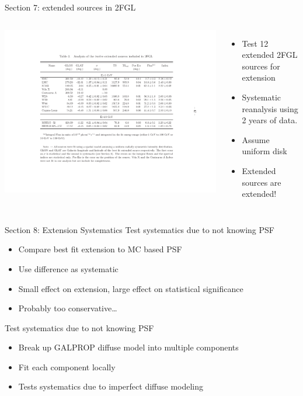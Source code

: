 \documentclass[12pt]{beamer}
\begin{document}
\begin{frame}{Section 7: extended sources in 2FGL}
  \begin{columns}
    \includegraphics[scale=0.4]{plots/table_reanalysis.pdf}
    \begin{itemize}
      \item Test 12 extended 2FGL sources for extension
      \item Systematic reanalysis using 2 years of data.
      \item Assume uniform disk
      \item Extended sources are extended!
    \end{itemize}
  \end{columns}
\end{frame}

\begin{frame}{Section 8: Extension Systematics}
  Test systematics due to not knowing PSF
  \begin{itemize}
    \item Compare best fit extension to 
      MC based PSF
    \item Use difference as systematic
    \item Small effect on extension, large effect on statistical 
      significance
    \item Probably too conservative\dots
  \end{itemize}
  Test systematics due to not knowing PSF
  \begin{itemize}
    \item Break up GALPROP diffuse model into multiple components 
    \item Fit each component locally
    \item Tests systematics due to imperfect diffuse modeling
  \end{itemize}
\end{frame}
\end{document}
